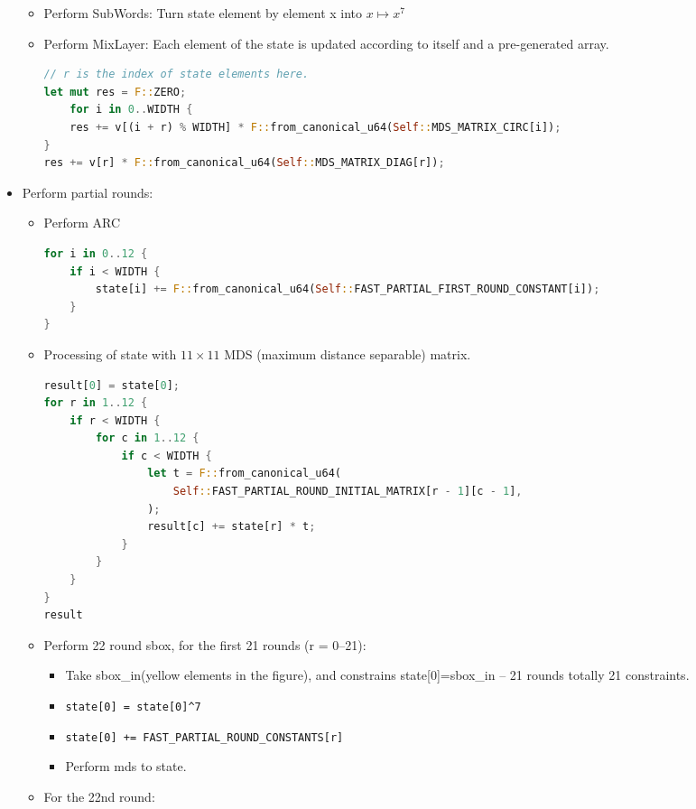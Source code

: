 \begin{itemize}
\begin{itemize}
        \item Perform SubWords: Turn state element by element x into $x \mapsto x^7$
        \item Perform MixLayer: Each element of the state is updated according to itself and a pre-generated array.
        \begin{lstlisting}[language=rust]
// r is the index of state elements here.
let mut res = F::ZERO;
    for i in 0..WIDTH {
    res += v[(i + r) % WIDTH] * F::from_canonical_u64(Self::MDS_MATRIX_CIRC[i]);
}
res += v[r] * F::from_canonical_u64(Self::MDS_MATRIX_DIAG[r]);
        \end{lstlisting}
    \end{itemize}
    \item Perform partial rounds:
    \begin{itemize}
        \item Perform ARC
        \begin{lstlisting}[language=rust]
for i in 0..12 {
    if i < WIDTH {
        state[i] += F::from_canonical_u64(Self::FAST_PARTIAL_FIRST_ROUND_CONSTANT[i]);
    }
}
        \end{lstlisting}
        \item Processing of state with $11 \times 11$ MDS (maximum distance separable) matrix.
        \begin{lstlisting}[language=rust]
result[0] = state[0];
for r in 1..12 {
    if r < WIDTH {
        for c in 1..12 {
            if c < WIDTH {
                let t = F::from_canonical_u64(
                    Self::FAST_PARTIAL_ROUND_INITIAL_MATRIX[r - 1][c - 1],
                );
                result[c] += state[r] * t;
            }
        }
    }
}
result
        \end{lstlisting}
        \item Perform 22 round sbox, for the first 21 rounds (r = 0--21):
        \begin{itemize}
            \item Take sbox\_in(yellow elements in the figure), and constrains state[0]=sbox\_in -- 21 rounds totally 21 constraints.
            \item \verb|state[0] = state[0]^7|
            \item \verb|state[0] += FAST_PARTIAL_ROUND_CONSTANTS[r]|
            \item Perform mds to state.
        \end{itemize}
        \item For the 22nd round:
        \begin{itemize}

\end{itemize}
\end{itemize}
\end{itemize}
